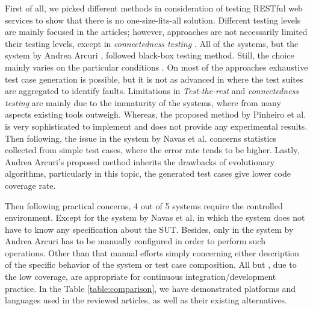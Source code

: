\documentclass[english]{tktltiki}
\begin{document}
First of all, we picked different methods in consideration of testing RESTful web services to show that there is no one-size-fits-all solution. Different testing levels are mainly focused in the articles; however, approaches are not necessarily limited their testing levels, except in \textit{connectedness testing} \cite{chakrabarti2010connectedness}. All of the systems, but the system by Andrea Arcuri \cite{arcuri2017restful}, followed black-box testing method. Still, the choice mainly varies on the particular conditions \cite{canfora2009service}. On most of the approaches \cite{chakrabarti2009test, chakrabarti2010connectedness, pinheiro2013model} exhaustive test case generation is possible, but it is not as advanced in \cite{arcuri2017restful} where the test suites are aggregated to identify faults. Limitations in \textit{Test-the-rest} and \textit{connectedness testing} \cite{chakrabarti2009test, chakrabarti2010connectedness} are mainly due to the immaturity of the systems, where from many aspects existing tools outweigh. Whereas, the proposed method by Pinheiro et al. \cite{pinheiro2013model} is very sophisticated to implement and does not provide any experimental results. Then following, the issue in the system by Navas et al. \cite{navas2014rest} concerns statistics collected from simple test cases, where the error rate tends to be higher. Lastly, Andrea Arcuri's proposed method \cite{arcuri2017restful} inherits the drawbacks of evolutionary algorithms, particularly in this topic, the generated test cases give lower code coverage rate.

Then following practical concerns, 4 out of 5 systems require the controlled environment. Except for the system by Navas et al. \cite{navas2014rest} in which the system does not have to know any specification about the SUT. Besides, only in the system by Andrea Arcuri \cite{arcuri2017restful} has to be manually configured in order to perform such operations. Other than that manual efforts simply concerning either description of the specific behavior of the system or test case composition. All but \cite{arcuri2017restful}, due to the low coverage, are appropriate for continuous integration/development practice. In the Table \ref{table:comparison}, we have demonstrated platforms and languages used in the reviewed articles, as well as their existing alternatives.
\end{document}
